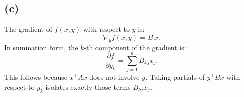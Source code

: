\documentclass{article}
\begin{document}
\subsection*{(c)}
The gradient of \(f(x, y)\) with respect to \(y\) is:
\[
\nabla_y f(x, y) = B\,x.
\]
In summation form, the \(k\)-th component of the gradient is:
\[
\frac{\partial f}{\partial y_k} 
= \sum_{j=1}^n B_{kj} x_j.
\]
This follows because \(x^\top A x\) does not involve \(y\). Taking partials of \(y^\top B x\) with respect to \(y_k\) isolates exactly those terms \(B_{kj} x_j\).
\end{document}
